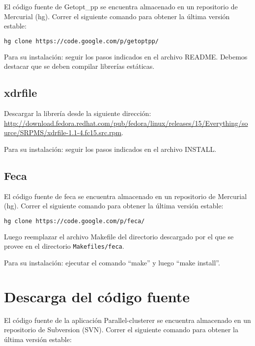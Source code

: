 \documentclass[12pt,spanish,a4paper]{report}
\begin{document}
El código fuente de Getopt\_pp se encuentra almacenado en un repositorio de Mercurial (hg). Correr el siguiente comando para obtener la última versión estable:

\begin{lstlisting}[frame=shadowbox, language=bash, basicstyle=\footnotesize, backgroundcolor=\color{gris}]
 hg clone https://code.google.com/p/getoptpp/
\end{lstlisting}

Para su instalación: seguir los pasos indicados en el archivo README. Debemos destacar que se deben compilar librerías estáticas.

\subsection{xdrfile}

Descargar la librería desde la siguiente dirección: \url{http://download.fedora.redhat.com/pub/fedora/linux/releases/15/Everything/source/SRPMS/xdrfile-1.1-4.fc15.src.rpm}.

Para su instalación: seguir los pasos indicados en el archivo INSTALL.

\subsection{Feca}

El código fuente de feca se encuentra almacenado en un repositorio de Mercurial (hg). Correr el siguiente comando para obtener la última versión estable:

\begin{lstlisting}[frame=shadowbox, language=bash, basicstyle=\footnotesize, backgroundcolor=\color{gris}]
 hg clone https://code.google.com/p/feca/
\end{lstlisting}

Luego reemplazar el archivo Makefile del directorio descargado por el que se provee en el directorio \texttt{Makefiles/feca}.

Para su instalación: ejecutar el comando ``make'' y luego ``make install''.


\section{Descarga del código fuente}

El código fuente de la aplicación Parallel-clusterer se encuentra almacenado en un repositorio de Subversion (SVN). Correr el siguiente comando para obtener la última versión estable:
\end{document}
